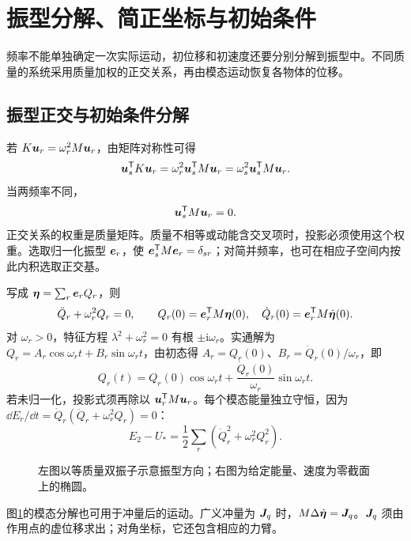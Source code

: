 \section{振型分解、简正坐标与初始条件}

频率不能单独确定一次实际运动，初位移和初速度还要分别分解到振型中。不同质量的系统采用质量加权的正交关系，再由模态运动恢复各物体的位移。



\subsection{振型正交与初始条件分解}
若 $K\bm{u}_r=\omega_r^2M\bm{u}_r$，由矩阵对称性可得
\[
\bm{u}_s^{\mathsf T}K\bm{u}_r
=\omega_r^2\bm{u}_s^{\mathsf T}M\bm{u}_r
=\omega_s^2\bm{u}_s^{\mathsf T}M\bm{u}_r.
\]
当两频率不同，
\begin{equation}
\bm{u}_s^{\mathsf T}M\bm{u}_r=0.
\label{sup4:eq:d7-orthogonal}
\end{equation}
正交关系的权重是质量矩阵。质量不相等或动能含交叉项时，投影必须使用这个权重。选取归一化振型 $\bm{e}_r$，使 $\bm{e}_s^{\mathsf T}M\bm{e}_r=\delta_{sr}$；对简并频率，也可在相应子空间内按此内积选取正交基。

写成 $\bm{\eta}=\sum_r\bm{e}_r Q_r$，则
\[
\ddot Q_r+\omega_r^2Q_r=0,\qquad
Q_r(0)=\bm{e}_r^{\mathsf T}M\bm{\eta}(0),\quad
\dot Q_r(0)=\bm{e}_r^{\mathsf T}M\dot{\bm{\eta}}(0).
\]
对 $\omega_r>0$，特征方程 $\lambda^2+\omega_r^2=0$ 有根 $\pm\mathrm i\omega_r$。实通解为 $Q_r=A_r\cos\omega_rt+B_r\sin\omega_rt$，由初态得 $A_r=Q_r(0)$、$B_r=\dot Q_r(0)/\omega_r$，即
\[
Q_r(t)=Q_r(0)\cos\omega_rt+\frac{\dot Q_r(0)}{\omega_r}\sin\omega_rt.
\]
若未归一化，投影式须再除以 $\bm{u}_r^{\mathsf T}M\bm{u}_r$。每个模态能量独立守恒，因为 $\dd E_r/\dd t=\dot Q_r(\ddot Q_r+\omega_r^2Q_r)=0$：
\[
E_2-U_* =\frac12\sum_r(\dot Q_r^2+\omega_r^2Q_r^2).
\]
\begin{figure}[H]\centering
{}
\caption{左图以等质量双振子示意振型方向；右图为给定能量、速度为零截面上的椭圆。}\label{sup4:fig:d7-modes}
\end{figure}
图\ref{sup4:fig:d7-modes}的模态分解也可用于冲量后的运动。广义冲量为 $\bm{J}_q$ 时，$M\Delta\dot{\bm{\eta}}=\bm{J}_q$。$\bm{J}_q$ 须由作用点的虚位移求出；对角坐标，它还包含相应的力臂。


